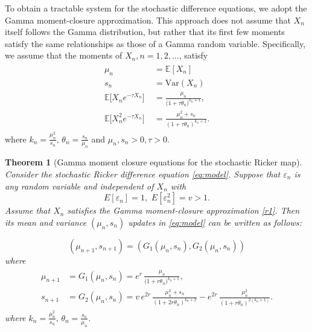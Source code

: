 \documentclass[10pt,a4paper]{amsart}
\newtheorem{theorem}{Theorem}
\begin{document}
To obtain a tractable system for the stochastic difference equations, we adopt the Gamma moment-closure approximation. This approach does not assume that $X_n$ itself follows the Gamma distribution,  but rather that its first few moments satisfy the same relationships as those of a Gamma random variable. 
Specifically, we assume that the moments of $X_n, n=1,2,...$, satisfy
\begin{align}
\begin{aligned}
\mu_n \qquad\qquad & = \mathbb{E}[X_n]\\
 s_n \qquad\qquad &= \mathrm{Var}(X_n) \\
\mathbb{E}\big[X_n e^{-\tau X_n}\big] &= \frac{\mu_n}{\big(1 + \tau \theta_n\big)^{k_n+1}}, \\
\mathbb{E}\big[X_n^2 e^{-\tau X_n}\big] &= \frac{\mu_n^2+s_n}{(1+\tau \theta_n)^{k_n+2}}.
\end{aligned}
\label{r1}
\end{align}
where $ k_n=\frac{\mu_n^2}{s_n}, \, \theta_n=\frac{s_n}{\mu_n}$ and $\mu_n, s_n>0, \tau>0$.

\begin{theorem}[Gamma moment closure equations for the stochastic Ricker map] \label{differeceEq}
Consider the stochastic Ricker difference equation \eqref{eq:model}. Suppose that $\varepsilon_n$ 
is any random variable and independent of $X_n$ with $$E[\varepsilon_n] = 1, \,\,E[\varepsilon_n^2] = v > 1.$$ Assume that $X_n$ satisfies the Gamma moment-closure approximation \eqref{r1}.  Then its mean and variance \((\mu_n,s_n)\) updates in \eqref{eq:model}  can be written as follows:

\begin{equation}\label{eq:closed-mu-s}
(\mu_{n+1},s_{n+1}) = (G_1(\mu_n,s_n), G_2(\mu_n,s_n))
\end{equation}
where
\begin{align}
\begin{aligned}
\mu_{n+1} &= G_1(\mu_n,s_n)= e^{r}\,\frac{\mu_n}{\big(1 + r \theta_n\big)^{k_n+1}}, \\
s_{n+1} & =G_2(\mu_n,s_n)= v\,e^{2r}\,\frac{\mu_n^2+s_n}{(1+2r \theta_n)^{k_n+2}}
- e^{2r}\,\frac{\mu_n^2}{(1+r \theta_n)^{2(k_n+1)}}.
\end{aligned}
\label{expressions}
\end{align}
where $ k_n=\frac{\mu_n^2}{s_n}, \, \theta_n=\frac{s_n}{\mu_n}$.
\end{theorem}
\end{document}
